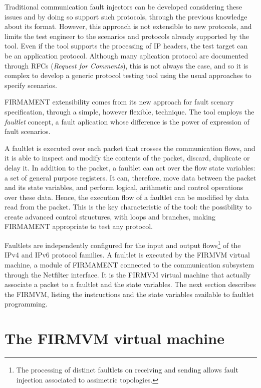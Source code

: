 \documentclass[11pt]{article}
\begin{document}
Traditional communication fault injectors can be developed considering these issues and by doing so support such protocols, through the previous knowledge about its format. However, this approach is not extensible to new protocols, and limits the test engineer to the scenarios and protocols already supported by the tool. Even if the tool supports the processing of IP headers, the test target can be an application protocol. Although many aplication protocol are documented through RFCs ({\em Request for Comments}), this is not always the case, and so it is complex to develop a generic protocol testing tool using the usual approaches to specify scenarios. 

\textsf{FIRMAMENT} extensibility comes from its new approach for fault scenary specification, through a simple, however flexible, technique. The tool employs the {\em faultlet} concept, a fault aplication whose difference is the power of expression of fault scenarios.

A faultlet is executed over each packet that crosses the communication flows, and it is able to inspect and modify the contents of the packet, discard, duplicate or delay it. In addition to the packet, a faultlet can act over the flow state variables: a set of general purpose registers. It can, therefore, move data between the packet and its state variables, and perform logical, arithmetic and control operations over these data. Hence, the execution flow of a faultlet can be modified by data read from the packet. This is the key characteristic of the tool: the possibility to create advanced control structures, with loops and branches, making \textsf{FIRMAMENT} appropriate to test any protocol.

Faultlets are independently configured for the input and output flows\footnote{The processing of distinct faultlets on receiving and sending allows fault injection associated to assimetric topologies.} of the IPv4 and IPv6 protocol families. A faultlet is executed by the \textsf{FIRMVM} virtual machine, a module of \textsf{FIRMAMENT} connected to the communication subsystem through the Netfilter interface. It is the \textsf{FIRMVM} virtual machine that actually associate a packet to a faultlet and the state variables. The next section describes the \textsf{FIRMVM}, listing the instructions and the state variables available to faultlet programming. 

\section{The \textsf{FIRMVM} virtual machine}\label{sec:instructions}
\end{document}
